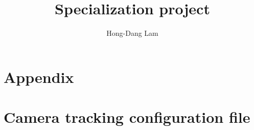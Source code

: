 \documentclass[12pt, a4paper]{article}
\title{Specialization project}
\author{Hong-Dang Lam}
\begin{document}
\maketitle
{}
\newpage
\begin{abstract}

\end{abstract}

\newpage
\tableofcontents
\newpage
\listoffigures
\newpage
\listoftables
\newpage
{}






\section{Appendix}
\appendix
{}
\section{Camera tracking configuration file}
\label{app:opencvcfg}
	
	
\newpage
{}
\nocite{*}


\end{document}
